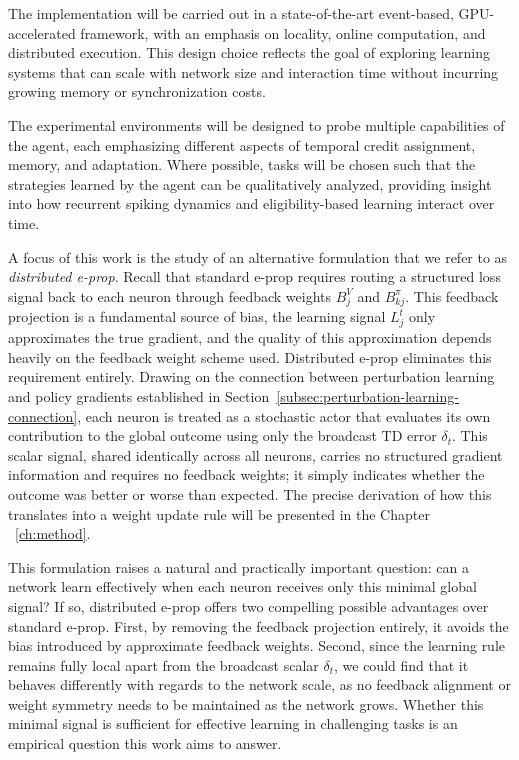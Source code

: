The implementation will be carried out in a state-of-the-art event-based,
GPU-accelerated framework, with an emphasis on locality, online computation,
and distributed execution. This design choice reflects the goal of exploring
learning systems that can scale with network size and interaction time without
incurring growing memory or synchronization costs.

The experimental environments will be designed to probe multiple capabilities
of the agent, each emphasizing different aspects of temporal credit
assignment, memory, and adaptation. Where possible, tasks will be chosen such
that the strategies learned by the agent can be qualitatively analyzed,
providing insight into how recurrent spiking dynamics and eligibility-based
learning interact over time.

A focus of this work is the study of an alternative
formulation that we refer to as \emph{distributed e-prop}. Recall that
standard e-prop requires routing a structured loss signal back to each neuron
through feedback weights $B^V_j$ and $B^\pi_{kj}$. This feedback projection
is a fundamental source of bias, the learning signal $L^t_j$ only
approximates the true gradient, and the quality of this approximation depends
heavily on the feedback weight scheme used. Distributed e-prop eliminates
this requirement entirely. Drawing on the connection between perturbation
learning and policy gradients established in Section~\ref{subsec:perturbation-learning-connection},
each neuron is treated as a stochastic actor that evaluates its own
contribution to the global outcome using only the broadcast TD error
$\delta_t$. This scalar signal, shared identically across all neurons,
carries no structured gradient information and requires no feedback weights;
it simply indicates whether the outcome was better or worse than expected.
The precise derivation of how this translates into a weight update rule will
be presented in the Chapter ~\ref{ch:method}.

This formulation raises a natural and practically important question:
can a network learn effectively when each neuron receives only this minimal global
signal? If so, distributed e-prop offers two compelling possible advantages over
standard e-prop. First, by removing the feedback projection entirely, it
avoids the bias introduced by approximate feedback weights. Second, since the
learning rule remains fully local apart from the broadcast scalar
$\delta_t$, we could find that it behaves differently with regards to the network scale, as no feedback alignment or
weight symmetry needs to be maintained as the network grows. Whether this
minimal signal is sufficient for effective learning in challenging tasks is an empirical question this work aims to answer.

